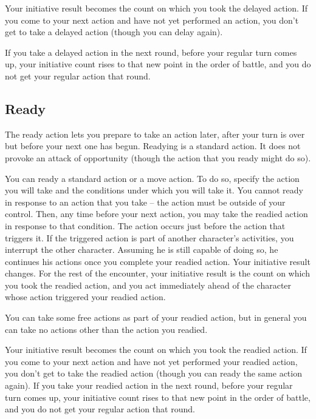  Your initiative result becomes the count on which you took the delayed action. If you come to your next action and have not yet performed an action, you don't get to take a delayed action (though you can delay again).

If you take a delayed action in the next round, before your regular turn comes up, your initiative count rises to that new point in the order of battle, and you do not get your regular action that round.

\subsection{Ready}\label{Ready}
The ready action lets you prepare to take an action later, after your turn is over but before your next one has begun. Readying is a standard action. It does not provoke an attack of opportunity (though the action that you ready might do so).

 You can ready a standard action or a move action. To do so, specify the action you will take and the conditions under which you will take it. You cannot ready in response to an action that you take -- the action must be outside of your control. Then, any time before your next action, you may take the readied action in response to that condition. The action occurs just before the action that triggers it. If the triggered action is part of another character's activities, you interrupt the other character. Assuming he is still capable of doing so, he continues his actions once you complete your readied action. Your initiative result changes. For the rest of the encounter, your initiative result is the count on which you took the readied action, and you act immediately ahead of the character whose action triggered your readied action.

You can take some free actions as part of your readied action, but in general you can take no actions other than the action you readied.

 Your initiative result becomes the count on which you took the readied action. If you come to your next action and have not yet performed your readied action, you don't get to take the readied action (though you can ready the same action again). If you take your readied action in the next round, before your regular turn comes up, your initiative count rises to that new point in the order of battle, and you do not get your regular action that round.

